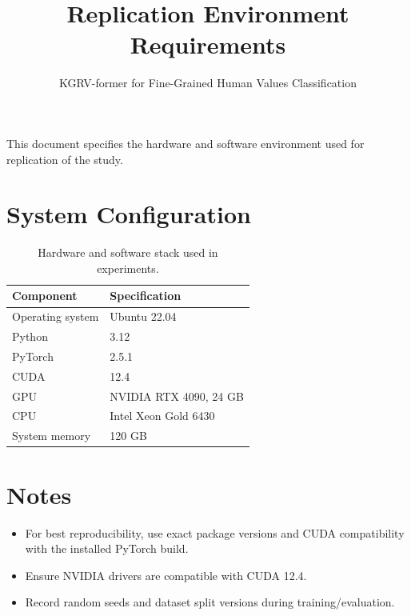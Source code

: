 \documentclass{article}
\title{Replication Environment Requirements}
\author{KGRV-former for Fine-Grained Human Values Classification}
\date{}
\begin{document}
\maketitle

This document specifies the hardware and software environment used for replication of the study.

\section*{System Configuration}
\begin{table}[h!]
\centering
\begin{tabular}{ll}
\toprule
\textbf{Component} & \textbf{Specification} \\
\midrule
Operating system & Ubuntu 22.04 \\
Python & 3.12 \\
PyTorch & 2.5.1 \\
CUDA & 12.4 \\
GPU & NVIDIA RTX 4090, 24 GB \\
CPU & Intel Xeon Gold 6430 \\
System memory & 120 GB \\
\bottomrule
\end{tabular}
\caption{Hardware and software stack used in experiments.}
\end{table}

\section*{Notes}
\begin{itemize}
  \item For best reproducibility, use exact package versions and CUDA compatibility with the installed PyTorch build.
  \item Ensure NVIDIA drivers are compatible with CUDA 12.4.
  \item Record random seeds and dataset split versions during training/evaluation.
\end{itemize}
\end{document}
